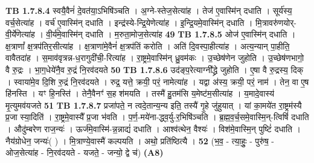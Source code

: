 \documentclass[17pt]{extarticle}
\begin{document}
                  \newline
                                \textbf{ TB 1.7.8.4} \newline
                  स्वयै॒वैनं॑ दे॒वत॑या॒ऽभिषि॑ञ्चति । अ॒ग्ने-स्तेज॒सेत्या॑ह । तेज॑ ए॒वास्मि॑न् दधाति । सूर्य॑स्य॒ वर्च॒सेत्या॑ह । वर्च॑ ए॒वास्मि॑न् दधाति । इन्द्र॑स्ये-न्द्रि॒येणेत्या॑ह । इ॒न्द्रि॒यमे॒वास्मि॑न् दधाति । मि॒त्रावरु॑णयोर्-वी॒र्ये॑णेत्या॑ह । वी॒र्य॑मे॒वास्मि॑न् दधाति । म॒रुता॒मोज॒सेत्या॑ह \textbf{ 49} \newline
                  \newline
                                \textbf{ TB 1.7.8.5} \newline
                  ओज॑ ए॒वास्मि॑न् दधाति । क्ष॒त्राणां᳚ क्ष॒त्रप॑तिर॒सीत्या॑ह । क्ष॒त्राणा॑मे॒वैनं॑ क्ष॒त्रप॑तिं करोति । अति॑ दि॒वस्पा॒हीत्या॑ह । अत्य॒न्यान् पा॒हीति॒ वावैतदा॑ह । स॒माव॑वृत्रन्न-ध॒रागुदी॑ची॒-रित्या॑ह । रा॒ष्ट्रमे॒वास्मि॑न् ध्रु॒वम॑कः । उ॒च्छेष॑णेन जुहोति । उ॒च्छेष॑णभागो॒ वै रु॒द्रः । भा॒ग॒धेये॑नै॒व रु॒द्रं नि॒रव॑दयते \textbf{ 50} \newline
                  \newline
                                \textbf{ TB 1.7.8.6} \newline
                  उद॑ङ्प॒रेत्याग्नी᳚द्ध्रे जुहोति । ए॒षा वै रु॒द्रस्य॒ दिक् । स्वाया॑मे॒व दि॒शि रु॒द्रं नि॒रव॑दयते । रुद्र॒ यत्ते॒ क्रयी॒ परं॒ नामेत्या॑ह । यद्वा अ॑स्य॒ क्रयी॒ परं॒ नाम॑ । तेन॒ वा ए॒ष हि॑नस्ति । यꣳ हि॒नस्ति॑ । तेनै॒वैनꣳ॑ स॒ह श॑मयति । तस्मै॑ हु॒तम॑सि य॒मेष्ट॑म॒सीत्या॑ह । य॒मादे॒वास्य॑ मृ॒त्युमव॑यजते \textbf{ 51} \newline
                  \newline
                                \textbf{ TB 1.7.8.7} \newline
                  प्रजा॑पते॒ न त्वदे॒तान्य॒न्य इति॒ तस्यै॑ गृ॒हे जु॑हुयात् । यां का॒मये॑त रा॒ष्ट्रम॑स्यै प्र॒जा स्या॒दिति॑ । रा॒ष्ट्रमे॒वास्यै᳚ प्र॒जा भ॑वति । प॒र्ण॒-मये॑ना-द्ध्व॒र्यु-र॒भिषि॑ञ्चति । ब्र॒ह्म॒व॒र्च॒समे॒वास्मि॒न्-त्विषिं॑ दधाति । औदु॑म्बरेण राज॒न्यः॑ । ऊर्ज॑मे॒वास्मि॑-न्न॒न्नाद्यं॑ दधाति । आश्व॑त्थेन॒ वैश्यः॑ । विश॑मे॒वास्मि॒न् पुष्टिं॑ दधाति । नैय॑ग्रोधेन॒ जन्यः॑( ) । मि॒त्राण्ये॒वास्मै॑ कल्पयति । अथो॒ प्रति॑ष्ठित्यै । \textbf{ 52} \newline
                  \newline
                                    (भ॒व॒ - त्या॒हुः॒ - पुरु॑ष॒ - ओज॒सेत्या॑ह - नि॒रव॑दयते - यजते॒ - जन्यो॒ द्वे च॑) \textbf{(A8)} \newline \newline
\end{document}
